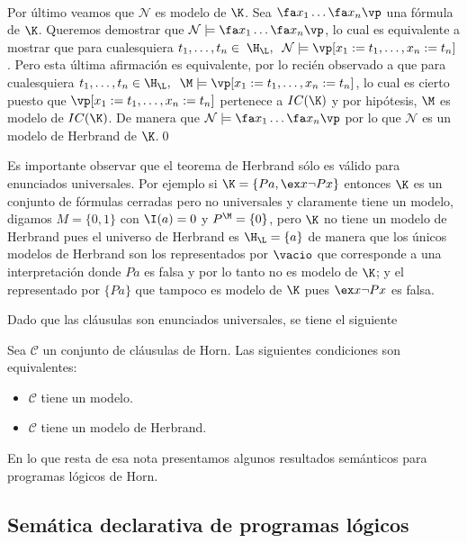 \documentclass[11pt,letterpaper]{article}
\begin{document}
\\ Por \'ultimo veamos que $\mathcal{N}$ es modelo de $\K$. Sea $\fa 
x_1\ldots\fa
x_n\vp$ una f\'ormula de $\K$. Queremos demostrar que $\mathcal{N}\models\fa
x_1\ldots\fa x_n\vp$, lo cual es equivalente a mostrar que para cualesquiera 
$t_1,\ldots,t_n\in\;\H_\L,\;\;\mathcal{N}\models\vp[x_1:=t_1,\ldots,x_n:=t_n]$. 
Pero esta \'ultima afirmaci\'on es equivalente, por lo reci\'en observado a que
para cualesquiera
$t_1,\ldots,t_n\in \H_\L,\;\;\M\models\vp[x_1:=t_1,\ldots,x_n:=t_n]$,
lo cual es cierto puesto que $\vp[x_1:=t_1,\ldots,x_n:=t_n]$ pertenece a
$IC(\K)$ y por hip\'otesis, $\M$ es modelo de $IC(\K)$. De manera que 
$\mathcal{N}\models\fa x_1\ldots\fa x_n\vp$ por lo que $\mathcal{N}$ es un 
modelo de Herbrand de $\K$.\qed 


\medskip

Es importante observar que el teorema de Herbrand s\'olo es v\'alido para
enunciados universales. Por ejemplo si 
$\K=\{Pa,\ex x \neg Px\}$ entonces $\K$ es un conjunto de f\'ormulas cerradas
pero no universales y claramente tiene un modelo, digamos
$M=\{0,1\}$ con $\I(a)=0$ y $P^\M=\{0\}$, pero $\K$ no tiene un modelo de 
Herbrand pues el universo de Herbrand es $\H_\L=\{a\}$ de manera que los 
\'unicos modelos de Herbrand son los representados por $\vacio$ que corresponde 
a una  interpretaci\'on donde $Pa$ es falsa y por lo tanto no es modelo de 
$\K$; y el representado por $\{Pa\}$ que tampoco es modelo de $\K$ pues $\ex 
x\neg Px$ es falsa.

\smallskip

Dado que las cl\'ausulas son enunciados universales, se tiene el siguiente
\vspace*{-5pt}
\begin{corollary}
Sea $\mathcal{C}$ un conjunto de cl\'ausulas de Horn. Las siguientes 
condiciones son equivalentes:
  \begin{itemize}
  \item $\mathcal{C}$ tiene un modelo.
  \item $\mathcal{C}$ tiene un modelo de Herbrand.
  \end{itemize}
\end{corollary}

\noindent En lo que resta de esa nota presentamos algunos resultados 
sem\'anticos para programas l\'ogicos de Horn. 

\subsection{Sem\'atica declarativa de programas l\'ogicos}
\end{document}
